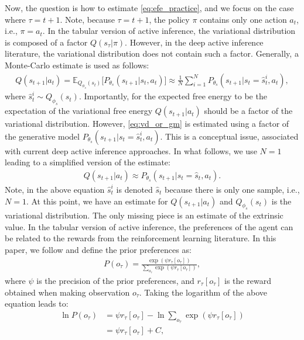 \documentclass[twoside,11pt]{article}
\begin{document}
Now, the question is how to estimate \eqref{eq:efe_practice}, and we focus on the case where $\tau = t + 1$. Note, because $\tau = t+1$, the policy $\pi$ contains only one action $a_t$, i.e., $\pi = a_t$. In the tabular version of active inference, the variational distribution is composed of a factor $Q(s_\tau | \pi)$. However, in the deep active inference literature, the variational distribution does not contain such a factor. Generally, a Monte-Carlo estimate is used as follows:
\begin{align}
Q(s_{t+1} | a_t) = \mathbb{E}_{Q_{\phi_s}(s_t)}\big[P_{\theta_s}(s_{t+1}|s_t, a_t)\big] \approx \frac{1}{N} \sum_{i = 1}^N P_{\theta_s}(s_{t+1}|s_t = \hat{s}_t^i, a_t), \label{eq:vd_or_gm}
\end{align}
where $\hat{s}_t^i \sim Q_{\phi_s}(s_t)$. Importantly, for the expected free energy to be the expectation of the variational free energy $Q(s_{t+1} | a_t)$ should be a factor of the variational distribution. However, \eqref{eq:vd_or_gm} is estimated using a factor of the generative model $P_{\theta_s}(s_{t+1}|s_t = \hat{s}_t^i, a_t)$. This is a conceptual issue, associated with current deep active inference approaches. 
In what follows, we use $N=1$ leading to a simplified version of the estimate:
\begin{align}
Q(s_{t+1} | a_t) \approx P_{\theta_s}(s_{t+1}|s_t = \hat{s}_t, a_t).
\end{align}
Note, in the above equation $\hat{s}_t^i$ is denoted $\hat{s}_t$ because there is only one sample, i.e., $N=1$. At this point, we have an estimate for $Q(s_{t+1} | a_t)$ and $Q_{\phi_s}(s_t)$ is the variational distribution. The only missing piece is an estimate of the extrinsic value. In the tabular version of active inference, the preferences of the agent can be related to the rewards from the reinforcement learning literature. In this paper, we follow \citep{dacosta2020relationship} and define the prior preferences as:
\begin{align*}
P(o_\tau) = \frac{\exp(\psi r_\tau[o_\tau])}{\sum_{o_\tau} \exp(\psi r_\tau[o_\tau])},
\end{align*}
where $\psi$ is the precision of the prior preferences, and $r_\tau[o_\tau]$ is the reward obtained when making observation $o_\tau$. Taking the logarithm of the above equation leads to:
\begin{align}
\ln P(o_\tau) &= \psi r_\tau[o_\tau] - \ln \sum_{o_\tau} \exp(\psi r_\tau[o_\tau])\nonumber\\
&= \psi r_\tau[o_\tau] + C, \label{eq:prior_pref}
\end{align}
\end{document}
